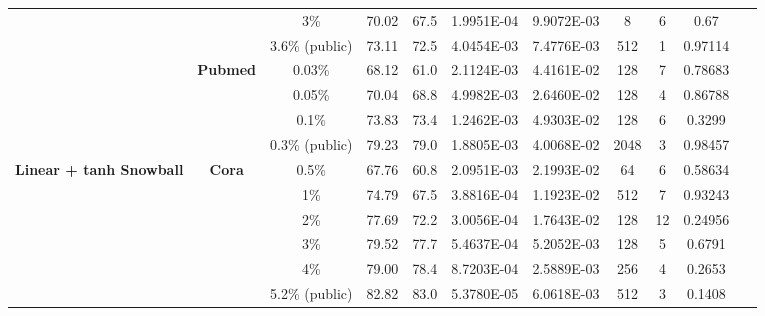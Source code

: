 \begin{table}[htbp]
\begin{tabular}{ccccc|cccccc}
          &       & 3\%   & \cellcolor[rgb]{ .388,  .745,  .482}70.02 & \cellcolor[rgb]{ .973,  .412,  .42}67.5 & 1.9951E-04 & 9.9072E-03 & 8     & 6     & 0.67  & ~ \\
          &       & 3.6\% (public) & \cellcolor[rgb]{ .388,  .745,  .482}73.11 & \cellcolor[rgb]{ .973,  .412,  .42}72.5 & 4.0454E-03 & 7.4776E-03 & 512   & 1     & 0.97114 & ~ \\
          & \multirow{4}[1]{*}{\textbf{Pubmed}} & 0.03\% & \cellcolor[rgb]{ .388,  .745,  .482}68.12 & \cellcolor[rgb]{ .973,  .412,  .42}61.0 & 2.1124E-03 & 4.4161E-02 & 128   & 7     & 0.78683 & ~ \\
          &       & 0.05\% & \cellcolor[rgb]{ .388,  .745,  .482}70.04 & \cellcolor[rgb]{ .973,  .412,  .42}68.8 & 4.9982E-03 & 2.6460E-02 & 128   & 4     & 0.86788 & ~ \\
          &       & 0.1\% & \cellcolor[rgb]{ .388,  .745,  .482}73.83 & \cellcolor[rgb]{ .973,  .412,  .42}73.4 & 1.2462E-03 & 4.9303E-02 & 128   & 6     & 0.3299 & ~ \\
          &       & 0.3\% (public) & \cellcolor[rgb]{ .388,  .745,  .482}79.23 & \cellcolor[rgb]{ .973,  .412,  .42}79.0 & 1.8805E-03 & 4.0068E-02 & 2048  & 3     & 0.98457 & ~ \\
    \midrule
    \multirow{15}[2]{*}{\textbf{Linear + tanh Snowball}} & \multirow{6}[1]{*}{\textbf{Cora}} & 0.5\% & \cellcolor[rgb]{ .388,  .745,  .482}67.76 & \cellcolor[rgb]{ .973,  .412,  .42}60.8 & 2.0951E-03 & 2.1993E-02 & 64    & 6     & 0.58634 & ~ \\
          &       & 1\%   & \cellcolor[rgb]{ .388,  .745,  .482}74.79 & \cellcolor[rgb]{ .973,  .412,  .42}67.5 & 3.8816E-04 & 1.1923E-02 & 512   & 7     & 0.93243 & ~ \\
          &       & 2\%   & \cellcolor[rgb]{ .388,  .745,  .482}77.69 & \cellcolor[rgb]{ .973,  .412,  .42}72.2 & 3.0056E-04 & 1.7643E-02 & 128   & 12    & 0.24956 & ~ \\
          &       & 3\%   & \cellcolor[rgb]{ .388,  .745,  .482}79.52 & \cellcolor[rgb]{ .973,  .412,  .42}77.7 & 5.4637E-04 & 5.2052E-03 & 128   & 5     & 0.6791 & ~ \\
          &       & 4\%   & \cellcolor[rgb]{ .388,  .745,  .482}79.00 & \cellcolor[rgb]{ .973,  .412,  .42}78.4 & 8.7203E-04 & 2.5889E-03 & 256   & 4     & 0.2653 & ~ \\
          &       & 5.2\% (public) & \cellcolor[rgb]{ .973,  .412,  .42}82.82 & \cellcolor[rgb]{ .388,  .745,  .482}83.0 & 5.3780E-05 & 6.0618E-03 & 512   & 3     & 0.1408 & ~ \\

\end{tabular}
\end{table}
